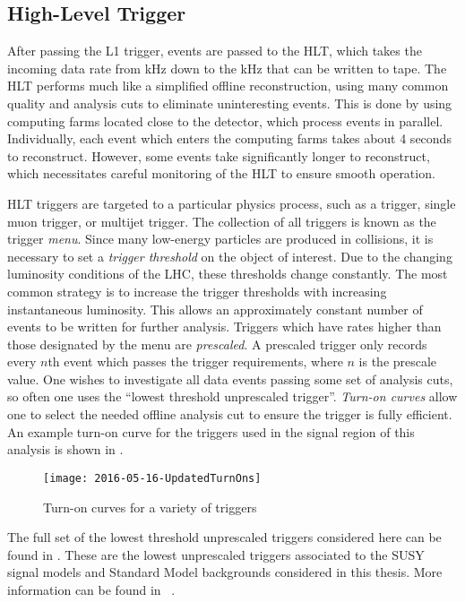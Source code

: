 \subsection{High-Level Trigger}

After passing the L1 trigger, events are passed to the HLT, which takes the incoming data rate from  kHz down to the  kHz that can be written to tape.
The HLT performs much like a simplified offline reconstruction, using many common quality and analysis cuts to eliminate uninteresting events.
This is done by using computing farms located close to the detector, which process events in parallel.
Individually, each event which enters the computing farms takes about 4 seconds to reconstruct.
However, some events take significantly longer to reconstruct, which necessitates careful monitoring of the HLT to ensure smooth operation.

HLT triggers are targeted to a particular physics process, such as a \met trigger, single muon trigger, or multijet trigger.
The collection of all triggers is known as the trigger \textit{menu}.
Since many low-energy particles are produced in collisions, it is necessary to set a \textit{trigger threshold} on the object of interest.
Due to the changing luminosity conditions of the LHC, these thresholds change constantly.
The most common strategy is to increase the trigger thresholds with increasing instantaneous luminosity.
This allows an approximately constant number of events to be written for further analysis.
Triggers which have rates higher than those designated by the menu are \textit{prescaled}.
A prescaled trigger only records every $n$th event which passes the trigger requirements, where $n$ is the prescale value.
One wishes to investigate all data events passing some set of analysis cuts, so often one uses the ``lowest threshold unprescaled trigger''.
\textit{Turn-on curves} allow one to select the needed offline analysis cut to ensure the trigger is fully efficient.
An example turn-on curve for the \met triggers used in the signal region of this analysis is shown in .
\begin{figure}[tbp]
\caption{Turn-on curves for a variety of \met triggers} \label{fig:met_turnon}
\texttt{[image: 2016-05-16-UpdatedTurnOns]}
\end{figure}

The full set of the lowest threshold unprescaled triggers considered here can be found in .
These are the lowest unprescaled triggers associated to the SUSY signal models and Standard Model backgrounds considered in this thesis.
More information can be found in ~\cite{ATL-DAQ-PUB-2016-001}.

